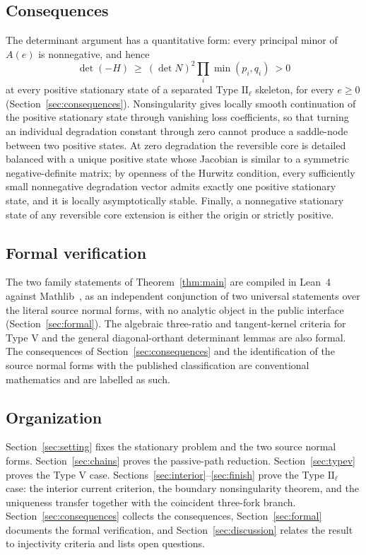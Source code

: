 \documentclass[11pt,a4paper]{article}
\theoremstyle{plain}
\theoremstyle{definition}
\theoremstyle{remark}
\numberwithin{equation}{section}
\newcommand{\II}{\mathrm{II}}
\newcommand{\V}{\mathrm{V}}
\begin{document}
\subsection*{Consequences}
The determinant argument has a quantitative form: every principal minor of $A(e)$ is nonnegative, and hence
\[
\det(-H)\ \ge\ (\det N)^2\prod_i\min(p_i,q_i)\ >0
\]
at every positive stationary state of a separated Type $\II_\ell$ skeleton, for every $e\ge0$ (Section~\ref{sec:consequences}). Nonsingularity gives locally smooth continuation of the positive stationary state through vanishing loss coefficients, so that turning an individual degradation constant through zero cannot produce a saddle-node between two positive states. At zero degradation the reversible core is detailed balanced with a unique positive state whose Jacobian is similar to a symmetric negative-definite matrix; by openness of the Hurwitz condition, every sufficiently small nonnegative degradation vector admits exactly one positive stationary state, and it is locally asymptotically stable. Finally, a nonnegative stationary state of any reversible core extension is either the origin or strictly positive.

\subsection*{Formal verification}
The two family statements of Theorem~\ref{thm:main} are compiled in Lean~4~\cite{dMU21} against Mathlib~\cite{mathlib20}, as an independent conjunction of two universal statements over the literal source normal forms, with no analytic object in the public interface (Section~\ref{sec:formal}). The algebraic three-ratio and tangent-kernel criteria for Type $\V$ and the general diagonal-orthant determinant lemmas are also formal. The consequences of Section~\ref{sec:consequences} and the identification of the source normal forms with the published classification are conventional mathematics and are labelled as such.

\subsection*{Organization}
Section~\ref{sec:setting} fixes the stationary problem and the two source normal forms. Section~\ref{sec:chains} proves the passive-path reduction. Section~\ref{sec:typev} proves the Type $\V$ case. Sections~\ref{sec:interior}--\ref{sec:finish} prove the Type $\II_\ell$ case: the interior current criterion, the boundary nonsingularity theorem, and the uniqueness transfer together with the coincident three-fork branch. Section~\ref{sec:consequences} collects the consequences, Section~\ref{sec:formal} documents the formal verification, and Section~\ref{sec:discussion} relates the result to injectivity criteria and lists open questions.
\end{document}
